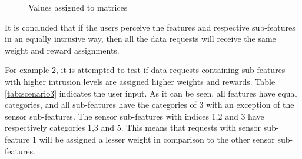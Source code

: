 \begin{figure}[htp]
  \hspace{1em}
  \caption{Values assigned to matrices}
  \label{fig:scenatio11}
\end{figure}

%

It is concluded that if the users perceive the features and respective sub-features in an equally intrusive way, then all the
data requests will receive the same weight and reward assignments.

For example 2, it is attempted to test if data requests containing sub-features with higher intrusion levels are assigned higher weights and rewards.
Table \ref{tab:scenario3} indicates the user input. As it can be seen, all features have equal categories, and
all sub-features have the categories of 3 with an exception of the sensor sub-features. The sensor sub-features with indices 1,2 and 3 have respectively categories 1,3 and 5. This means that requests with sensor sub-feature 1 will be assigned a lesser weight in comparison to the other sensor sub-features. 


